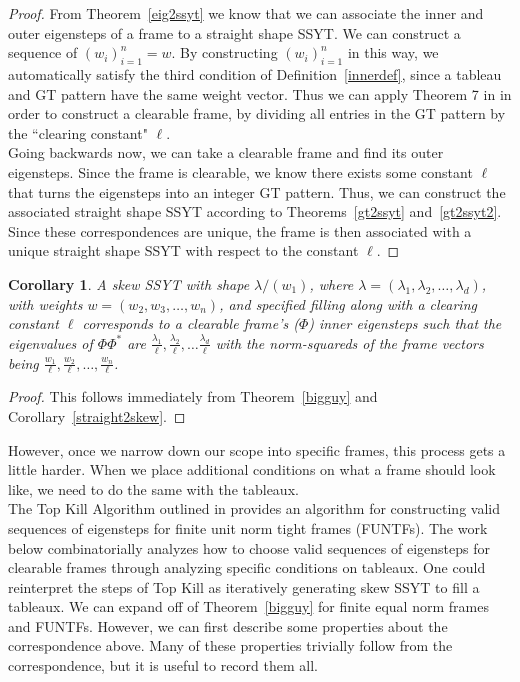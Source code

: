 \documentclass[10pt]{article}
\theoremstyle{plain}
\newtheorem{cor}[thm]{Corollary}
\theoremstyle{definition}
\begin{document}
\begin{proof}
From Theorem~\ref{eig2ssyt} we know that we can associate the inner and outer eigensteps of a frame to a straight shape SSYT. We can construct a sequence of $(w_i)^n_{i=1} = w $. By constructing $ (w_i)^n_{i=1}$ in this way, we automatically satisfy the third condition of Definition~\ref{innerdef}, since a tableau and GT pattern have the same weight vector. Thus we can apply Theorem 7 in \cite{cfmconstructingfiniteframes} in order to construct a clearable frame, by dividing all entries in the GT pattern by the ``clearing constant" $\ell$. \\

Going backwards now, we can take a clearable frame and find its outer eigensteps. Since the frame is clearable, we know there exists some constant $\ell$ that turns the eigensteps into an integer GT pattern. Thus, we can construct the associated straight shape SSYT according to Theorems~\ref{gt2ssyt} and~\ref{gt2ssyt2}. Since these correspondences are unique, the frame is then associated with a unique straight shape SSYT with respect to the constant $\ell$.  
\end{proof}

\begin{cor}\label{bigguy2} 
A skew SSYT with shape $\lambda / (w_1)$, where $\lambda = (\lambda_1, \lambda_2, \dots,\lambda_d)$, with weights $w=(w_2, w_3, \dots, w_n)$, and specified filling along with a clearing constant $\ell$ corresponds to a clearable frame's ($\Phi$) inner eigensteps such that the eigenvalues of $\Phi\Phi^\ast$ are $\frac{\lambda_1}{\ell}, \frac{\lambda_2}{\ell}, \dots \frac{\lambda_d}{\ell}$  with the norm-squareds of the frame vectors being $\frac{w_1}{\ell}, \frac{w_2}{\ell}, \dots, \frac{w_n}{\ell} $. 
\end{cor}
\begin{proof}
This follows immediately from Theorem~\ref{bigguy} and Corollary~\ref{straight2skew}.
\end{proof}

However, once we narrow down our scope into specific frames, this process gets a little harder. When we place additional conditions on what a frame should look like, we need to do the same with the tableaux. \\ 

The Top Kill Algorithm outlined in \cite{cfpconstructingselfadjoint} provides an algorithm for constructing valid sequences of eigensteps for finite unit norm tight frames (FUNTFs). The work below combinatorially analyzes how to choose valid sequences of eigensteps for clearable frames through analyzing specific conditions on tableaux. One could reinterpret the steps of Top Kill as iteratively generating skew SSYT to fill a tableaux.
We can expand off of Theorem~\ref{bigguy} for finite equal norm frames and FUNTFs. However, we can first describe some properties about the correspondence above. Many of these properties trivially follow from the correspondence, but it is useful to record them all. 
\end{document}
